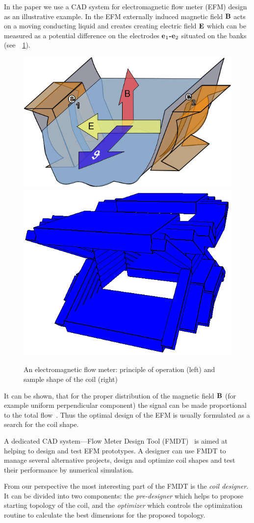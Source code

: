 \documentclass[twocolumn,a4paper]{article}
\def\vect#1{\text{\bf #1}}
\def\rref#1{\figurename~\ref{#1}}
\begin{document}
In the paper we use a CAD system for electromagnetic flow meter (EFM) design as an illustrative example. In the EFM externally induced magnetic field $\vect{B}$ acts on a moving conducting liquid and creates creating electric field $\vect{E}$ which can be measured as a potential difference on the electrodes \textbf{e$_\text1$-e$_\text2$} situated on the banks (see~\rref{fig1}).
\begin{figure}[htb]
\begin{center}
 \includegraphics[width=0.57\linewidth]{img/flow1a.png}
 \includegraphics[width=0.42\linewidth]{img/cewka_nizsza.png}
 \caption{An electromagnetic flow meter: principle of operation (left) and sample shape of the coil (right)}
 \label{fig1}
 \end{center}
\end{figure}
It can be shown, that for the proper distribution of the magnetic field $\vect{B}$ (for example uniform perpendicular component) the signal can be made proportional to the total
flow~\cite{IEEETM98fm}. Thus the optimal design of the EFM is usually formulated as a search for the coil shape.

A dedicated CAD system---Flow Meter Design Tool (FMDT)~\cite{IEEEInstrMeas2009} is aimed at helping to design and test EFM prototypes.
A designer can use FMDT to manage several alternative projects, design and optimize coil shapes and test their performance by numerical simulation.

From our perspective the most interesting part of the FMDT is the \textit{coil designer}. It can be
divided into two components: the \textit{pre-designer} which helps to propose starting topology of the coil, and the \textit{optimizer} which controls 
the optimization routine to calculate the best dimensions for the proposed topology.
\end{document}
